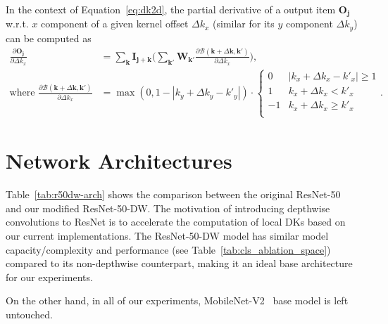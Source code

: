 \documentclass{article} \usepackage{iclr2020_conference, times}
\def\vj{{\bm{j}}}
\def\vk{{\bm{k}}}
\def\mI{{\bm{I}}}
\def\mO{{\bm{O}}}
\def\mW{{\bm{W}}}
\def\gB{{\mathcal{B}}}
\begin{document}
In the context of Equation~\ref{eq:dk2d}, the partial derivative of a output
item $\mO_{\vj}$ w.r.t.  $x$ component of a given kernel offset $\Delta k_x$ (similar for its $y$ component $\Delta k_y$) can be computed as
\begin{align}
    \frac{\partial \mO_{\vj}}{\partial \Delta k_x}
    &=
    \sum_{\vk}
    \mI_{\vj + \vk}
    \bigg(
        \sum_{\vk'}
        \mW_{\vk'}
        \frac{\partial \gB (\vk + \Delta \vk, \vk')}{\partial \Delta k_x}
    \bigg), \\
    \text{where  }
    \frac{\partial \gB (\vk + \Delta \vk, \vk')}{\partial \Delta k_x}
    &=
    \max(0, 1 - |k_y + \Delta k_y-k'_y|)
    \cdot
    \begin{cases}
    0 & |k_x + \Delta k_x-k'_x| \geq 1 \\
    1 & k_x + \Delta k_x < k'_x\\
    -1 & k_x + \Delta k_x \geq k'_x\\
    \end{cases}. \nonumber
\end{align}

\section{Network Architectures}

Table~\ref{tab:r50dw-arch} shows the comparison between the original
ResNet-50~\citep{he2016deep} and our modified ResNet-50-DW.
The motivation of introducing depthwise convolutions to ResNet is to accelerate
the computation of local DKs based on our current implementations.
The ResNet-50-DW model has similar model capacity/complexity and performance
(see Table~\ref{tab:cls_ablation_space}) compared to its non-depthwise
counterpart, making it an ideal base architecture
for our experiments.

On the other hand, in all of our experiments,
MobileNet-V2~\citep{sandler2018mobilenetv2} base model is left untouched.
\end{document}
